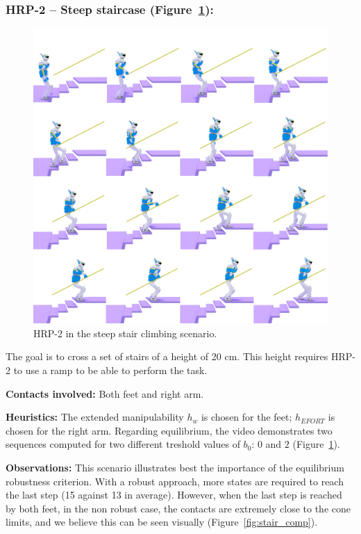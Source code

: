 \subsubsection{HRP-2 -- Steep staircase (Figure~\ref{fig:stair_robust}):}

\begin{figure}
  \centering
  \includegraphics[width=0.5\linewidth]{figures/stair}
  \caption{
           HRP-2 in the steep stair climbing scenario. }
		   \label{fig:stair_robust}
\end{figure}

The goal is to cross a set of stairs of a height of 20 cm. This height requires HRP-2 to use a ramp to be able to perform the task.

\noindent\textbf{Contacts involved:} Both feet and right arm.

\noindent\textbf{Heuristics:} The extended manipulability $h_w$ is chosen for the feet; $h_{EFORT}$ is chosen for the right arm.
Regarding equilibrium, the video demonstrates two sequences computed for two different treshold values of $b_0$: $0$ and $2$ (Figure~\ref{fig:stair_robust}). 

\noindent\textbf{Observations:}
This scenario illustrates best the importance of the equilibrium robustness criterion.
With a robust approach, more states are required to reach the last step (15 against 13 in average).
However, when the last step is reached by both feet, in the non robust case, the contacts are extremely close to 
the cone limits, and we believe this can be seen visually (Figure~\ref{fig:stair_comp}).


